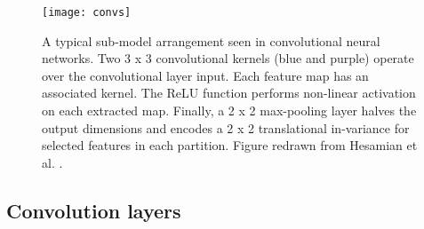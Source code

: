\begin{figure}[H]
	\begin{center}
		\texttt{[image: convs]}
		\caption{A typical sub-model arrangement seen in convolutional neural networks. Two 3 x 3 convolutional kernels (blue and purple) operate over the convolutional layer input. Each feature map has an associated kernel. The ReLU function performs non-linear activation on each extracted map. Finally, a 2 x 2 max-pooling layer halves the output dimensions and encodes a 2 x 2 translational in-variance for selected features in each partition. Figure redrawn from Hesamian et al. \cite{Hesamian2019}.}
		\label{fig:convs}
	\end{center}
\end{figure}

\subsection{Convolution layers}

